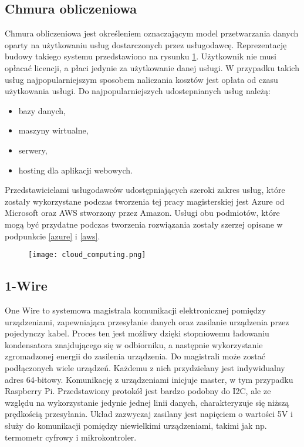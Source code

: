 \subsection{Chmura obliczeniowa}
Chmura obliczeniowa jest określeniem oznaczającym model przetwarzania danych oparty na użytkowaniu usług dostarczonych przez usługodawcę. Reprezentację budowy takiego systemu przedstawiono na rysunku \ref{fig:chmura_obliczeniowa}. Użytkownik nie musi opłacać licencji, a płaci jedynie za użytkowanie danej usługi. W przypadku takich usług najpopularniejszym sposobem naliczania kosztów jest opłata od czasu użytkowania usługi.
Do najpopularniejszych udostepnianych usług należą:
\begin{itemize}
\item bazy danych,
\item maszyny wirtualne,
\item serwery,
\item hosting dla aplikacji webowych.
\end{itemize}
Przedstawicielami usługodawców udostępniających szeroki zakres usług, które zostały wykorzystane podczas tworzenia tej pracy magisterskiej jest Azure od Microsoft oraz AWS stworzony przez Amazon. Usługi obu podmiotów, które mogą być przydatne podczas tworzenia rozwiązania zostały szerzej opisane w podpunkcie \ref{azure} i \ref{aws}.
\begin{figure}[H]
	\centering
	\texttt{[image: cloud\_computing.png]}
	\label{fig:chmura_obliczeniowa}
\end{figure}
\subsection{1-Wire} \label{1wire}
One Wire \cite{raspberry} to systemowa magistrala komunikacji elektronicznej pomiędzy urządzeniami, zapewniająca przesyłanie danych oraz zasilanie urządzenia przez pojedynczy kabel. Proces ten jest możliwy dzięki stopniowemu ładowaniu kondensatora znajdującego się w odbiorniku, a następnie wykorzystanie zgromadzonej energii do zasilenia urządzenia. Do magistrali może zostać podłączonych wiele urządzeń. Każdemu z nich przydzielany jest indywidualny adres 64-bitowy. Komunikację z urządzeniami inicjuje master, w tym przypadku Raspberry Pi.
Przedstawiony protokół jest bardzo podobny do I2C, ale ze względu na wykorzystanie jedynie jednej linii danych, charakteryzuje się niższą prędkością przesyłania. Układ zazwyczaj zasilany jest napięciem o wartości 5V i służy do komunikacji pomiędzy niewielkimi urządzeniami, takimi jak np. termometr cyfrowy i mikrokontroler.

